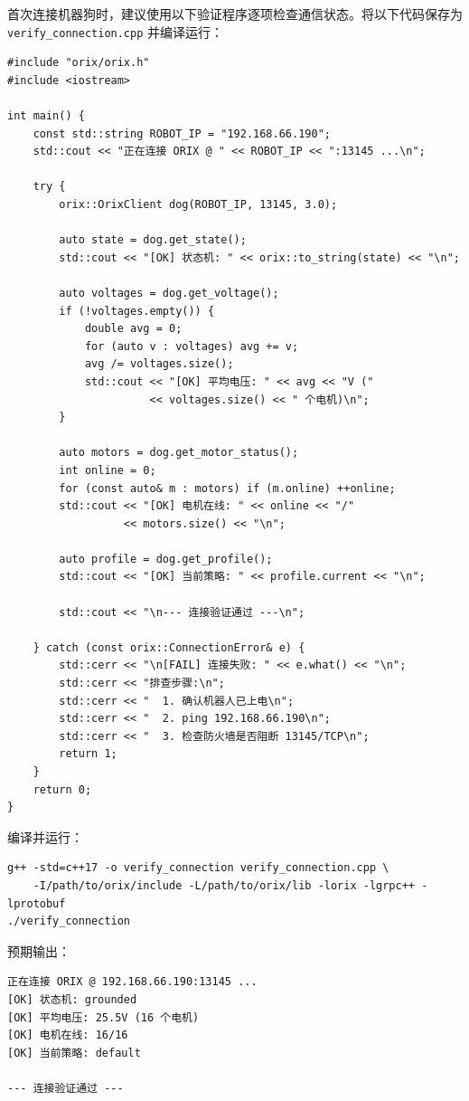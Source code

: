 \documentclass[a4paper,11pt,openany]{book}
\begin{document}
首次连接机器狗时，建议使用以下验证程序逐项检查通信状态。将以下代码保存为 \texttt{verify\_connection.cpp} 并编译运行：

\begin{lstlisting}[style=cpp]
#include "orix/orix.h"
#include <iostream>

int main() {
    const std::string ROBOT_IP = "192.168.66.190";
    std::cout << "正在连接 ORIX @ " << ROBOT_IP << ":13145 ...\n";

    try {
        orix::OrixClient dog(ROBOT_IP, 13145, 3.0);

        auto state = dog.get_state();
        std::cout << "[OK] 状态机: " << orix::to_string(state) << "\n";

        auto voltages = dog.get_voltage();
        if (!voltages.empty()) {
            double avg = 0;
            for (auto v : voltages) avg += v;
            avg /= voltages.size();
            std::cout << "[OK] 平均电压: " << avg << "V ("
                      << voltages.size() << " 个电机)\n";
        }

        auto motors = dog.get_motor_status();
        int online = 0;
        for (const auto& m : motors) if (m.online) ++online;
        std::cout << "[OK] 电机在线: " << online << "/"
                  << motors.size() << "\n";

        auto profile = dog.get_profile();
        std::cout << "[OK] 当前策略: " << profile.current << "\n";

        std::cout << "\n--- 连接验证通过 ---\n";

    } catch (const orix::ConnectionError& e) {
        std::cerr << "\n[FAIL] 连接失败: " << e.what() << "\n";
        std::cerr << "排查步骤:\n";
        std::cerr << "  1. 确认机器人已上电\n";
        std::cerr << "  2. ping 192.168.66.190\n";
        std::cerr << "  3. 检查防火墙是否阻断 13145/TCP\n";
        return 1;
    }
    return 0;
}
\end{lstlisting}

编译并运行：

\begin{lstlisting}[style=bash]
g++ -std=c++17 -o verify_connection verify_connection.cpp \
    -I/path/to/orix/include -L/path/to/orix/lib -lorix -lgrpc++ -lprotobuf
./verify_connection
\end{lstlisting}

预期输出：

\begin{lstlisting}[style=plain,numbers=none]
正在连接 ORIX @ 192.168.66.190:13145 ...
[OK] 状态机: grounded
[OK] 平均电压: 25.5V (16 个电机)
[OK] 电机在线: 16/16
[OK] 当前策略: default

--- 连接验证通过 ---
\end{lstlisting}
\end{document}
